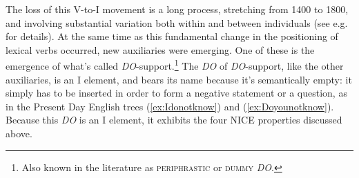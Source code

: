 \noindent The loss of this V-to-I movement is a long process, stretching from 1400 to 1800, and involving substantial variation both within and between individuals (see e.g. \citet{HaeberliIhsane2016} for details). At the same time as this fundamental change in the positioning of lexical verbs occurred, new auxiliaries were emerging. One of these is the emergence of what's called \textit{DO}-support.\footnote{Also known in the literature as \textsc{periphrastic} or \textsc{dummy} \textit{DO}.} The \textit{DO} of \textit{DO}-support, like the other auxiliaries, is an I element, and bears its name because it's semantically empty: it simply has to be inserted in order to form a negative statement or a question, as in the Present Day English trees (\ref{ex:Idonotknow}) and (\ref{ex:Doyounotknow}). Because this \textit{DO} is an I element, it exhibits the four NICE properties discussed above.

\begin{multicols}{2}
\begin{exe}
\ex \label{ex:Idonotknow}

\ex \label{ex:Doyounotknow}
\end{exe}
\end{multicols}
\setlength{\columnsep}{10pt}

